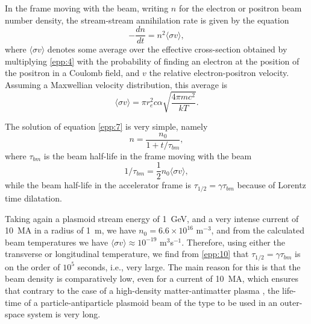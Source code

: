 \documentclass [12pt,a4paper,     ]{report} %
\begin{document}
In the frame moving with the beam, writing $n$ for the electron or positron beam number density, the stream-stream annihilation rate is given by the equation \cite{GSPON1986A}
%
\begin{equation} \label{epp:7} 
      - \frac{dn}{dt}  = n^2 \langle \sigma v \rangle,
\end{equation}
%
where $\langle \sigma v \rangle$ denotes some average over the effective cross-section obtained by multiplying \eqref{epp:4} with the probability of finding an electron at the position of the positron in a Coulomb field, and $v$ the relative electron-positron velocity.  Assuming a Maxwellian velocity distribution, this average is
%
\begin{equation} \label{epp:8} 
  \langle \sigma v \rangle = \pi r_e^2 c \alpha \sqrt{\frac{4\pi mc^2}{kT}}.
\end{equation}
%

   The solution of equation \eqref{epp:7} is very simple, namely
%
\begin{equation} \label{epp:9} 
  n = \frac{n_0}{1 + t/\tau_{bm}},
\end{equation}
%
where $\tau_{bm}$ is the beam half-life in the frame moving with the beam
%
\begin{equation} \label{epp:10} 
  1/\tau_{bm} = \frac{1}{2} n_0 \langle \sigma v \rangle,
\end{equation}
%
while the beam half-life in the accelerator frame is $\tau_{1/2} = \gamma\tau_{bm}$ because of Lorentz time dilatation.

Taking again a plasmoid stream energy of 1~GeV, and a very intense current of 10~MA in a radius of 1~m, we have $n_0 = 6.6 \times 10^{16}$ m$^{-3}$, and from the calculated beam temperatures we have $\langle \sigma v \rangle \approx 10^{-19}$ m$^{3}$s$^{-1}$.  Therefore, using either the transverse or longitudinal temperature, we find from \eqref{epp:10} that $\tau_{1/2} = \gamma\tau_{bm}$ is on the order of $10^{5}$ seconds, i.e., very large.  The main reason for this is that the beam density is comparatively low, even for a current of 10~MA, which ensures that contrary to the case of a high-density matter-antimatter plasma \cite{GSPON1986A}, the life-time of a particle-antiparticle plasmoid beam of the type to be used in an outer-space system is very long.
\end{document}
